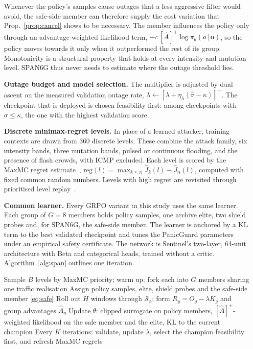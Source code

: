 \documentclass[conference]{IEEEtran}
\begin{document}
Whenever the policy's samples cause outages that a less aggressive filter would avoid, the safe-side member can therefore supply the cost variation that Prop.~\ref{prop:cancel} shows to be necessary. The member influences the policy only through an advantage-weighted likelihood term, $-c\,[\hat A]^+\log\pi_\theta(\tilde a\,|\,\mathbf{o})$, so the policy moves towards it only when it outperformed the rest of its group. Monotonicity is a structural property that holds at every intensity and mutation level. SPAN6G thus never needs to estimate where the outage threshold lies.

\textbf{Outage budget and model selection.} The multiplier is adjusted by dual ascent on the measured validation outage rate, $\lambda\leftarrow[\lambda+\eta_\lambda(\hat\sigma-\kappa)]^+$. The checkpoint that is deployed is chosen feasibility first: among checkpoints with $\hat\sigma\le\kappa$, the one with the highest validation score.

\textbf{Discrete minimax-regret levels.} In place of a learned attacker, training contexts are drawn from 360 discrete levels. These combine the attack family, six intensity bands, three mutation bands, pulsed or continuous flooding, and the presence of flash crowds, with ICMP excluded. Each level is scored by the MaxMC regret estimate~\cite{jiang2021robustplr}, $\mathrm{reg}(l)=\max_{k\le n}\hat J_k(l)-\hat J_n(l)$, computed with fixed common random numbers. Levels with high regret are revisited through prioritised level replay~\cite{jiang2021plr}.

\textbf{Common learner.} Every GRPO variant in this study uses the same learner. Each group of $G=8$ members holds policy samples, one archive elite, two shield probes and, for SPAN6G, the safe-side member. The learner is anchored by a KL term to the best validated checkpoint and tunes the PanicGuard parameters under an empirical safety certificate. The network is Sentinel's two-layer, 64-unit architecture with Beta and categorical heads, trained without a critic. Algorithm~\ref{alg:span} outlines one iteration.

\begin{algorithm}[t]
\caption{One SPAN6G training iteration}
\label{alg:span}
\small
\begin{algorithmic}[1]
\STATE Sample $B$ levels by MaxMC priority; warm up; fork each into $G$ members sharing one traffic realisation
\STATE Assign policy samples, elite, shield probes and the safe-side member \eqref{eq:safe}
\STATE Roll out $H$ windows through $\mathcal{S}_\phi$; form $R_g=O_g-\lambda K_g$ and group advantages $\hat A_g$
\STATE Update $\theta$: clipped surrogate on policy members, $[\hat A]^+$-weighted likelihood on the safe member and the elite, KL to the current champion
\STATE Every $K$ iterations: validate, update $\lambda$, select the champion feasibility first, and refresh MaxMC regrets
\end{algorithmic}
\end{algorithm}
\end{document}
